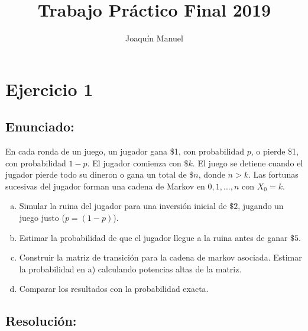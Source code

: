 \documentclass{article}
\title{Trabajo Práctico Final 2019}
\author{Joaquín Manuel}
\date{}
\begin{document}
\maketitle

\section*{Ejercicio 1}
\subsection*{Enunciado:}
En cada ronda de un juego, un jugador gana \$1, con probabilidad $p$, o pierde \$1, con probabilidad $1-p$. El jugador comienza con $\$k$. El juego se detiene cuando el jugador pierde todo su dineron o gana un total de $\$n$, donde $n>k$. Las fortunas sucesivas del jugador forman una cadena de Markov en ${0,1,...,n}$ con $X_0 = k$.


\begin{enumerate}[(a)] %
\item Simular la ruina del jugador para una inversión inicial de $\$2$, jugando un juego justo ($p = (1-p)$).
\item Estimar la probabilidad de que el jugador llegue a la ruina antes de ganar $\$5$.
\item Construir la matriz de transición para la cadena de markov asociada. Estimar la probabilidad en a) calculando potencias altas de la matriz.
\item Comparar los resultados con la probabilidad exacta.
\end{enumerate}

\subsection*{Resolución:}
\end{document}
